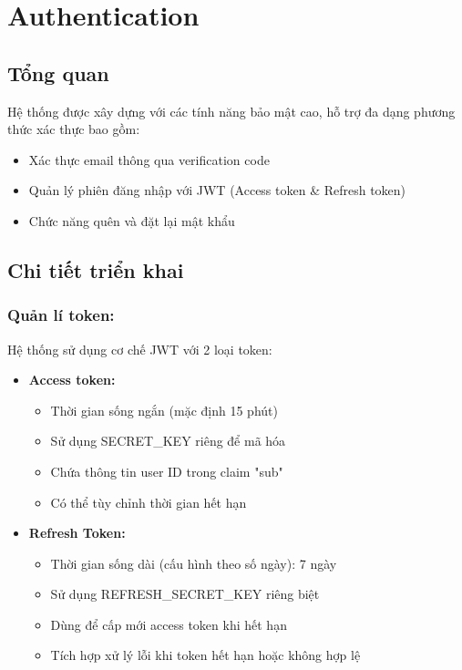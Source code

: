 \section{Authentication}
\subsection{Tổng quan}
Hệ thống  được xây dựng với các tính năng bảo mật cao, hỗ trợ đa dạng phương thức xác thực bao gồm:
\begin{itemize}
    \item Xác thực email thông qua verification code
    \item Quản lý phiên đăng nhập với JWT (Access token \& Refresh token)
    \item Chức năng quên và đặt lại mật khẩu
\end{itemize}
\subsection{Chi tiết triển khai}
\subsubsection{Quản lí token:}
Hệ thống sử dụng cơ chế JWT với 2 loại token:
\begin{itemize}
    \item \textbf{Access token:}
    \begin{itemize}
        \item Thời gian sống ngắn (mặc định 15 phút)
        \item Sử dụng SECRET\_KEY riêng để mã hóa
        \item Chứa thông tin user ID trong claim "sub"
        \item Có thể tùy chỉnh thời gian hết hạn
    \end{itemize}
    \item \textbf{Refresh Token:}
    \begin{itemize}
        \item Thời gian sống dài (cấu hình theo số ngày): 7 ngày
        \item Sử dụng REFRESH\_SECRET\_KEY riêng biệt
        \item Dùng để cấp mới access token khi hết hạn
        \item Tích hợp xử lý lỗi khi token hết hạn hoặc không hợp lệ
    \end{itemize}
\end{itemize}
